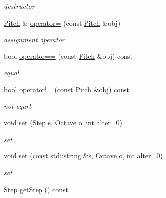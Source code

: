 \begin{DoxyCompactItemize}
\begin{DoxyCompactList}\small\item\em destructor \end{DoxyCompactList}\item 
\hypertarget{classsinsy_1_1Pitch_a3a4c21c8c1f3c73c6cc8219bc25b4702}{\hyperlink{classsinsy_1_1Pitch}{\-Pitch} \& \hyperlink{classsinsy_1_1Pitch_a3a4c21c8c1f3c73c6cc8219bc25b4702}{operator=} (const \hyperlink{classsinsy_1_1Pitch}{\-Pitch} \&obj)}\label{classsinsy_1_1Pitch_a3a4c21c8c1f3c73c6cc8219bc25b4702}

\begin{DoxyCompactList}\small\item\em assignment operator \end{DoxyCompactList}\item 
bool \hyperlink{classsinsy_1_1Pitch_acd7503c247ff1092b896726e6f9cf79c}{operator==} (const \hyperlink{classsinsy_1_1Pitch}{\-Pitch} \&obj) const 
\begin{DoxyCompactList}\small\item\em equal \end{DoxyCompactList}\item 
\hypertarget{classsinsy_1_1Pitch_a77fd4dfae3c6306ae7e2443310f70c7f}{bool \hyperlink{classsinsy_1_1Pitch_a77fd4dfae3c6306ae7e2443310f70c7f}{operator!=} (const \hyperlink{classsinsy_1_1Pitch}{\-Pitch} \&obj) const }\label{classsinsy_1_1Pitch_a77fd4dfae3c6306ae7e2443310f70c7f}

\begin{DoxyCompactList}\small\item\em not equrl \end{DoxyCompactList}\item 
\hypertarget{classsinsy_1_1Pitch_a60fa94e212ac3338205eef764a7d6f62}{void \hyperlink{classsinsy_1_1Pitch_a60fa94e212ac3338205eef764a7d6f62}{set} (\-Step s, \-Octave o, int alter=0)}\label{classsinsy_1_1Pitch_a60fa94e212ac3338205eef764a7d6f62}

\begin{DoxyCompactList}\small\item\em set \end{DoxyCompactList}\item 
\hypertarget{classsinsy_1_1Pitch_a97a3b3fca624f5bb4499e44dc16dc11e}{void \hyperlink{classsinsy_1_1Pitch_a97a3b3fca624f5bb4499e44dc16dc11e}{set} (const std\-::string \&s, \-Octave o, int alter=0)}\label{classsinsy_1_1Pitch_a97a3b3fca624f5bb4499e44dc16dc11e}

\begin{DoxyCompactList}\small\item\em set \end{DoxyCompactList}\item 
\hypertarget{classsinsy_1_1Pitch_ad0893397a5b9397fa4aeb2ab5a263d5c}{\-Step \hyperlink{classsinsy_1_1Pitch_ad0893397a5b9397fa4aeb2ab5a263d5c}{get\-Step} () const }\label{classsinsy_1_1Pitch_ad0893397a5b9397fa4aeb2ab5a263d5c}


\end{DoxyCompactItemize}
